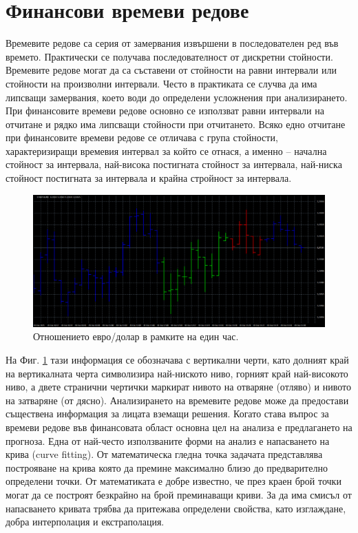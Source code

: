 \documentclass[book,14pt,oneside,openany]{memoir}
\begin{document}
\section{Финансови времеви редове}

Времевите редове са серия от замервания извършени в последователен ред във времето. Практически се получава последователност от дискретни стойности. Времевите редове могат да са съставени от стойности на равни интервали или стойности на произволни интервали. Често в практиката се случва да има липсващи замервания, което води до определени усложнения при анализирането. При финансовите времеви редове основно се използват равни интервали на отчитане и рядко има липсващи стойности при отчитането. Всяко едно отчитане при финансовите времеви редове се отличава с група стойности, характеризиращи времевия интервал за който се отнася, а именно – начална стойност за интервала, най-висока постигната стойност за интервала, най-ниска стойност постигната за интервала и крайна стройност за интервала. 

\begin{figure}[h]
  \centering
  \includegraphics[width=1.0\linewidth]{pic0003}
  \caption{Отношението евро/долар в рамките на един час.}
\label{fig:pic0003}
\end{figure}

На Фиг. \ref{fig:pic0003} тази информация се обозначава с вертикални черти, като долният край на вертикалната черта символизира най-ниското ниво, горният край най-високото ниво, а двете странични чертички маркират нивото на отваряне (отляво) и нивото на затваряне (от дясно). Анализирането на времевите редове може да предостави съществена информация за лицата вземащи решения. Когато става въпрос за времеви редове във финансовата област основна цел на анализа е предлагането на прогноза. Една от най-често използваните форми на анализ е напасването на крива (curve fitting). От математическа гледна точка задачата представлява построяване на крива която да премине максимално близо до предварително определени точки. От математиката е добре известно, че през краен брой точки могат да се построят безкрайно на брой преминаващи криви. За да има смисъл от напасването кривата трябва да притежава определени свойства, като изглаждане, добра интерполация и екстраполация. 
\end{document}
